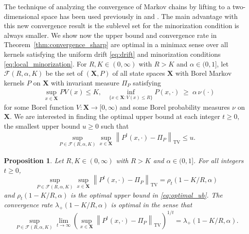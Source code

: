 \documentclass[ejsv2, noshowframe]{imsart}
\theoremstyle{plain}
\newtheorem{proposition}[theorem]{Proposition}
\theoremstyle{definition}
\theoremstyle{remark}
\newcommand{\norm}[1]{\left\lVert#1\right\rVert}
\renewcommand{\P}{P}
\newcommand{\X}{\textbf{X}}
\begin{document}
The technique of analyzing the convergence of Markov chains by lifting to a two-dimensional space has been used previously in \citep{canizo:mischler:2023} and \citep{hairer:mattingly:2011}.
The main advantage with this new convergence result is the sublevel set for the minorization condition is always smaller.
We show now the upper bound and convergence rate in Theorem~\ref{thm:convergence_sharp} are optimal in a minimax sense over all kernels satisfying the uniform drift \eqref{eq:drift} and minorization conditions \eqref{eq:local_minorization}.
For $R, K \in (0, \infty)$ with $R > K$ and $\alpha \in (0, 1]$, let $\mathcal{F}(R, \alpha, K)$ be the set of $(\X, \P)$ of all state spaces $\X$ with Borel Markov kernels $\P$ on $\X$ with invariant measure $\Pi_\P$ satisfying
\begin{align*}
&\sup_{x \in \X} P V(x) \le K,
&\inf_{\{x \in \X : V(x) \le R \}} P(x, \cdot) \;\ge\; \alpha \, \nu(\cdot)
\end{align*}
for some Borel function $V : \X \to [0, \infty)$ and some Borel probability measures $\nu$ on $\X$.
We are interested in finding the optimal upper bound at each integer $t \ge 0$, the smallest upper bound $u \ge 0$ such that
\begin{align}
\sup_{\P \in \mathcal{F}(R, \alpha, K)} \sup_{x \in \X} \norm{ \P^t(x, \cdot) - \Pi_{\P} }_{\text{TV}} \le u.
\label{eq:optimal_ub}
\end{align}

\begin{proposition}
Let $R, K \in (0, \infty)$ with $R > K$ and $\alpha \in (0, 1]$.
For all integers $t \ge 0$,
\[
\sup_{\P \in \mathcal{F}(R, \alpha, K)} 
\sup_{x \in \X} \norm{ \P^t(x, \cdot) - \Pi_{\P} }_{\text{TV}}
= \rho_t(1 - K/R, \alpha)
\]
and $\rho_t(1 - K/R, \alpha)$ is the optimal upper bound in \eqref{eq:optimal_ub}.
The convergence rate $\lambda_{+}(1 - K/R, \alpha)$ is optimal in the sense that
\[
\sup_{\P \in \mathcal{F}(R, \alpha, K)} 
\lim_{t \to \infty} \left( \sup_{x \in \X} \norm{ \P^t(x, \cdot) - \Pi_{\P} }_{\text{TV}} \right)^{1/t}
= \lambda_{+}(1 - K/R, \alpha).
\]
\end{proposition}
\end{document}
